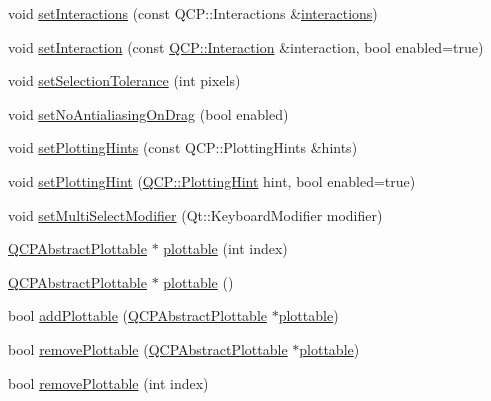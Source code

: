 \begin{DoxyCompactItemize}
void \hyperlink{class_q_custom_plot_a5ee1e2f6ae27419deca53e75907c27e5}{set\+Interactions} (const Q\+C\+P\+::\+Interactions \&\hyperlink{class_q_custom_plot_a12401c02b6949a717f5749bb28c62983}{interactions})
\item 
void \hyperlink{class_q_custom_plot_a422bf1bc6d56dac75a3d805d9a65902c}{set\+Interaction} (const \hyperlink{namespace_q_c_p_a2ad6bb6281c7c2d593d4277b44c2b037}{Q\+C\+P\+::\+Interaction} \&interaction, bool enabled=true)
\item 
void \hyperlink{class_q_custom_plot_a4dc31241d7b09680950e19e5f971ed93}{set\+Selection\+Tolerance} (int pixels)
\item 
void \hyperlink{class_q_custom_plot_a775bdcb6329d44701aeaa6135b0e5265}{set\+No\+Antialiasing\+On\+Drag} (bool enabled)
\item 
void \hyperlink{class_q_custom_plot_a94a33cbdadbbac5934843508bcfc210d}{set\+Plotting\+Hints} (const Q\+C\+P\+::\+Plotting\+Hints \&hints)
\item 
void \hyperlink{class_q_custom_plot_a3b7c97bb6c16464e9e15190c07abe9a9}{set\+Plotting\+Hint} (\hyperlink{namespace_q_c_p_a5400e5fcb9528d92002ddb938c1f4ef4}{Q\+C\+P\+::\+Plotting\+Hint} hint, bool enabled=true)
\item 
void \hyperlink{class_q_custom_plot_a8fc96e3b5138a06759a2a90c166df516}{set\+Multi\+Select\+Modifier} (Qt\+::\+Keyboard\+Modifier modifier)
\item 
\hyperlink{class_q_c_p_abstract_plottable}{Q\+C\+P\+Abstract\+Plottable} $\ast$ \hyperlink{class_q_custom_plot_a32de81ff53e263e785b83b52ecd99d6f}{plottable} (int index)
\item 
\hyperlink{class_q_c_p_abstract_plottable}{Q\+C\+P\+Abstract\+Plottable} $\ast$ \hyperlink{class_q_custom_plot_adea38bdc660da9412ba69fb939031567}{plottable} ()
\item 
bool \hyperlink{class_q_custom_plot_ab7ad9174f701f9c6f64e378df77927a6}{add\+Plottable} (\hyperlink{class_q_c_p_abstract_plottable}{Q\+C\+P\+Abstract\+Plottable} $\ast$\hyperlink{class_q_custom_plot_a32de81ff53e263e785b83b52ecd99d6f}{plottable})
\item 
bool \hyperlink{class_q_custom_plot_af3dafd56884208474f311d6226513ab2}{remove\+Plottable} (\hyperlink{class_q_c_p_abstract_plottable}{Q\+C\+P\+Abstract\+Plottable} $\ast$\hyperlink{class_q_custom_plot_a32de81ff53e263e785b83b52ecd99d6f}{plottable})
\item 
bool \hyperlink{class_q_custom_plot_afc210e0021480f8119bccf37839dbcc8}{remove\+Plottable} (int index)
\item 

\end{DoxyCompactItemize}
